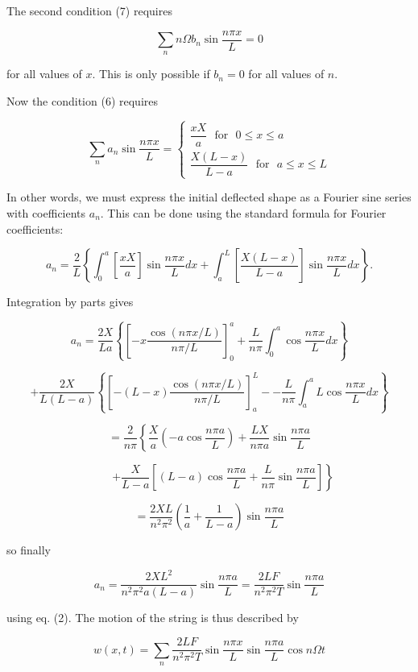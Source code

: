  The second condition (7) requires 

  $$\sum_n{n \Omega b_n \sin\dfrac{n \pi x}{L}}=0 \tag{8}$$ 

  for all values of $x$. This is only possible if $b_n=0$ for all values of 
  $n$. 

  Now the condition (6) requires 

  $$ \sum_n{a_n \sin \dfrac{n \pi x}{L}} = \left\{ \begin{array}{ll} 
  \dfrac{xX}{a} \mathrm{~~~for~~~} 0\le x\le a \\ \dfrac{X(L-x)}{L-a} 
  \mathrm{~~~for~~~} a\le x\le L \end{array} \right. \tag{9}$$ 

  In other words, we must express the initial deflected shape as a Fourier sine 
  series with coefficients $a_n$. This can be done using the standard formula 
  for Fourier coefficients: 

  $$a_n= \dfrac{2}{L} \left\lbrace \int_0^a{ \left[ \dfrac{xX}{a} \right] \sin 
  \dfrac{n \pi x}{L} dx } + \int_a^L{\left[ \dfrac{X(L-x)}{L-a} \right] \sin 
  \dfrac{n \pi x}{L} dx } \right\rbrace . \tag{10}$$ 

  Integration by parts gives 

  $$a_n=\dfrac{2X}{La} \left\lbrace \left[ -x \dfrac{\cos (n \pi x/L)}{n \pi/L} 
  \right] _0^a + \dfrac{L}{n \pi} \int_0^a{\cos \dfrac{n \pi x}{L} 
  dx}\right\rbrace $$ 

  $$+\dfrac{2X}{L(L-a)} \left\lbrace \left[ -(L-x) \dfrac{\cos (n \pi x/L)}{n 
  \pi/L} \right]_a^L -- \dfrac{L}{n \pi} \int_a^aL{\cos \dfrac{n \pi x}{L} 
  dx}\right\rbrace $$ 

  $$ = \dfrac{2}{n \pi}\left\lbrace \dfrac{X}{a}\left( -a \cos \dfrac{n \pi 
  a}{L}\right) +\dfrac{LX}{n \pi a}\sin \dfrac{n \pi a}{L} \right. $$ 

  $$\mathrm{~~~~~~~~~~~}\left. +\dfrac{X}{L-a}\left[ (L-a) \cos \dfrac{n \pi 
  a}{L} +\dfrac{L}{n \pi}\sin \dfrac{n \pi a}{L}\right] \right\rbrace $$ 

  $$= \dfrac{2XL}{n^2 \pi^2} \left( \dfrac{1}{a}+\dfrac{1}{L-a}\right) \sin 
  \dfrac{n \pi a}{L}$$ 

  so finally 

  $$a_n= \dfrac{2XL^2}{n^2 \pi^2 a(L-a)} \sin \dfrac{n \pi a}{L}= 
  \dfrac{2LF}{n^2 \pi^2 T} \sin \dfrac{n \pi a}{L} \tag{11}$$ 

  using eq. (2). The motion of the string is thus described by 

  $$w(x,t)= \sum_n{\dfrac{2LF}{n^2 \pi^2 T} \sin \dfrac{n \pi x}{L} \sin 
  \dfrac{n \pi a}{L} \cos n \Omega t } \tag{12}$$ 

